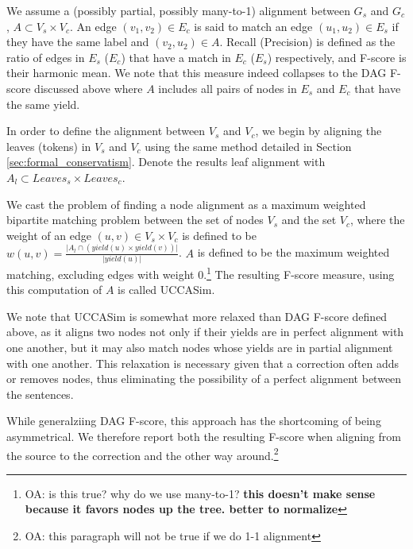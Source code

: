 \documentclass[letter,11pt]{article}
\newcommand{\oa}[1]{\footnote{\color{red}OA: #1}}
\begin{document}
We assume a (possibly partial, possibly many-to-1) alignment between $G_s$ and $G_c$,
$A \subset V_s \times V_c$. An edge $(v_1,v_2) \in E_c$ is said to match an edge
$(u_1,u_2) \in E_s$ if they have the same label and $(v_2,u_2) \in A$. Recall (Precision)
is defined as the ratio of edges in $E_s$ ($E_c$) that have a match in $E_c$ ($E_s$) respectively, and
F-score is their harmonic mean. We note that this measure indeed collapses to the
DAG F-score discussed above where $A$ includes all pairs of nodes in $E_s$ and $E_c$ that have
the same yield.

In order to define the alignment between $V_s$ and $V_c$, we begin by aligning the leaves
(tokens) in $V_s$ and $V_c$ using the same method detailed in Section \ref{sec:formal_conservatism}.
Denote the results leaf alignment with $A_l \subset Leaves_s \times Leaves_c$.

We cast the problem of finding a node alignment as a maximum weighted bipartite matching problem between
the set of nodes $V_s$ and the set $V_c$, where the weight of an edge $(u,v) \in V_s \times V_c$ is
defined to be $w(u,v) = \frac{\vert A_l \cap (yield(u) \times yield(v))\vert}{\vert yield(u) \vert} $.
$A$ is defined to be the maximum weighted matching, excluding edges
with weight 0.\oa{is this true? why do we use many-to-1? {\bf this doesn't make sense because it favors
nodes up the tree. better to normalize}}
The resulting F-score measure, using this computation of $A$ is called {\sc UCCASim}.

We note that {\sc UCCASim} is somewhat more relaxed than DAG F-score defined above,
as it aligns two nodes not only if their yields are in perfect alignment with
one another, but it may also match nodes whose yields are in partial alignment
with one another. This relaxation is necessary given that a correction often adds
or removes nodes, thus eliminating the possibility of a perfect alignment between
the sentences. 


While generalziing DAG F-score, this approach has the shortcoming
of being asymmetrical. We therefore report both the resulting F-score when aligning
from the source to the correction and the other way around.\oa{this paragraph will not be
  true if we do 1-1 alignment}
\end{document}
